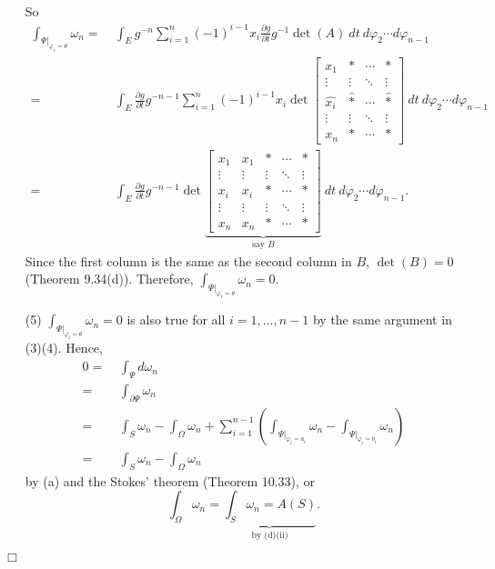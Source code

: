\documentclass{article}
\begin{document}
\begin{enumerate}
\begin{align*}
  \end{align*}
  So
  \begin{align*}
    \int_{\Psi|_{\varphi_1=\theta}} \omega_n
    =& \: \int_{E} g^{-n}
      \sum_{i=1}^{n} (-1)^{i-1} x_i
      \frac{\partial g}{\partial t} g^{-1}
      \det(A)
      \: dt \: d\varphi_2 \cdots d\varphi_{n-1} \\
    =& \: \int_{E} \frac{\partial g}{\partial t} g^{-n-1}
      \sum_{i=1}^{n} (-1)^{i-1} x_i
      \det
      \begin{bmatrix}
        x_1
          & *
          & \cdots
          & * \\
        \vdots & \vdots & \ddots & \vdots \\
        \widehat{x_i}
          & \widehat{*}
          & \cdots
          & \widehat{*} \\
        \vdots & \vdots & \ddots & \vdots \\
        x_n
          & *
          & \cdots
          & *
      \end{bmatrix}
      \: dt \: d\varphi_2 \cdots d\varphi_{n-1} \\
    =& \: \int_{E} \frac{\partial g}{\partial t} g^{-n-1}
      \det
      \underbrace{\begin{bmatrix}
        x_1
          & x_1
          & *
          & \cdots
          & * \\
        \vdots & \vdots & \vdots & \ddots & \vdots \\
        x_i
          & x_i
          & *
          & \cdots
          & * \\
        \vdots & \vdots & \vdots & \ddots & \vdots \\
        x_n
          & x_n
          & *
          & \cdots
          & *
      \end{bmatrix}}_{\text{say $B$}}
      \: dt \: d\varphi_2 \cdots d\varphi_{n-1}.
  \end{align*}
  Since the first column is the same as the second column in $B$,
  $\det(B) = 0$ (Theorem 9.34(d)).
  Therefore, $\int_{\Psi|_{\varphi_1=\theta}} \omega_n = 0$.

\item[(5)]
  $\int_{\Psi|_{\varphi_i=\theta}} \omega_n = 0$ is also true for all $i = 1,\ldots,n-1$
  by the same argument in (3)(4).
  Hence,
  \begin{align*}
    0
    =& \: \int_{\Psi} d\omega_n \\
    =& \: \int_{\partial \Psi} \omega_n \\
    =& \: \int_{S} \omega_n - \int_{\Omega} \omega_n
      + \sum_{i=1}^{n-1}
        \left( \int_{\Psi|_{\varphi_i=a_i}} \omega_n
        - \int_{\Psi|_{\varphi_i=b_i}} \omega_n \right) \\
    =& \: \int_{S} \omega_n - \int_{\Omega} \omega_n
  \end{align*}
  by (a) and the Stokes' theorem (Theorem 10.33),
  or
  \[
    \int_{\Omega} \omega_n = \underbrace{\int_{S} \omega_n = A(S)}_{\text{by (d)(ii)}}.
  \]
\end{enumerate}
$\Box$ \\
\end{document}
